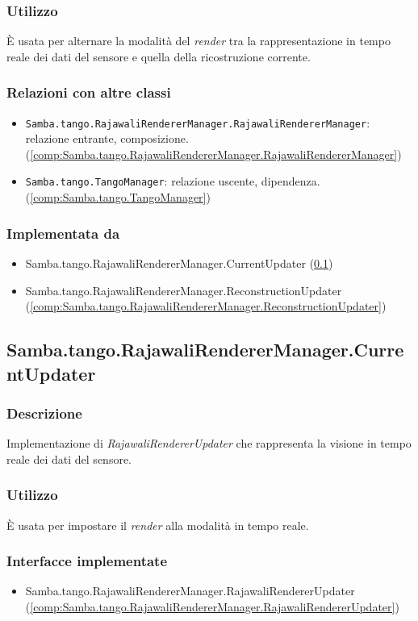 \subsubsection{Utilizzo}
È usata per alternare la modalità del \emph{render} tra la rappresentazione in tempo reale dei dati del sensore e quella della ricostruzione corrente.
\subsubsection{Relazioni con altre classi}
\begin{itemize}
	\item \texttt{Samba.tango.RajawaliRendererManager.RajawaliRendererManager}: relazione entrante, composizione. (\ref{comp:Samba.tango.RajawaliRendererManager.RajawaliRendererManager})
	\item \texttt{Samba.tango.TangoManager}: relazione uscente, dipendenza. (\ref{comp:Samba.tango.TangoManager})
\end{itemize}
\subsubsection{Implementata da}
\begin{itemize}
	\item Samba.tango.RajawaliRendererManager.CurrentUpdater (\ref{comp:Samba.tango.RajawaliRendererManager.CurrentUpdater})
	\item Samba.tango.RajawaliRendererManager.ReconstructionUpdater (\ref{comp:Samba.tango.RajawaliRendererManager.ReconstructionUpdater})
\end{itemize}


\subsection{Samba.tango.RajawaliRendererManager.CurrentUpdater}\label{comp:Samba.tango.RajawaliRendererManager.CurrentUpdater}
\subsubsection{Descrizione}
Implementazione di \emph{RajawaliRendererUpdater} che rappresenta la visione in tempo reale dei dati del sensore.
\subsubsection{Utilizzo}
È usata per impostare il \emph{render} alla modalità in tempo reale.
\subsubsection{Interfacce implementate}
\begin{itemize}
	\item Samba.tango.RajawaliRendererManager.RajawaliRendererUpdater (\ref{comp:Samba.tango.RajawaliRendererManager.RajawaliRendererUpdater})
\end{itemize}

